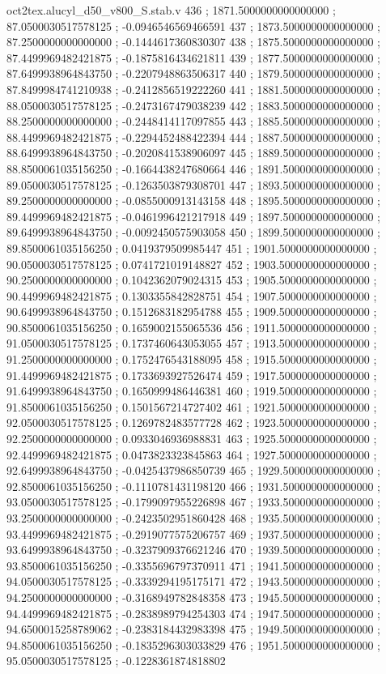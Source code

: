 \begin{filecontents}[overwrite]{oct2tex.alucyl_d50_v800_S.stab.v}
436 ; 1871.5000000000000000 ; 87.0500030517578125 ; -0.0946546569466591
437 ; 1873.5000000000000000 ; 87.2500000000000000 ; -0.1444617360830307
438 ; 1875.5000000000000000 ; 87.4499969482421875 ; -0.1875816434621811
439 ; 1877.5000000000000000 ; 87.6499938964843750 ; -0.2207948863506317
440 ; 1879.5000000000000000 ; 87.8499984741210938 ; -0.2412856519222260
441 ; 1881.5000000000000000 ; 88.0500030517578125 ; -0.2473167479038239
442 ; 1883.5000000000000000 ; 88.2500000000000000 ; -0.2448414117097855
443 ; 1885.5000000000000000 ; 88.4499969482421875 ; -0.2294452488422394
444 ; 1887.5000000000000000 ; 88.6499938964843750 ; -0.2020841538906097
445 ; 1889.5000000000000000 ; 88.8500061035156250 ; -0.1664438247680664
446 ; 1891.5000000000000000 ; 89.0500030517578125 ; -0.1263503879308701
447 ; 1893.5000000000000000 ; 89.2500000000000000 ; -0.0855000913143158
448 ; 1895.5000000000000000 ; 89.4499969482421875 ; -0.0461996421217918
449 ; 1897.5000000000000000 ; 89.6499938964843750 ; -0.0092450575903058
450 ; 1899.5000000000000000 ; 89.8500061035156250 ; 0.0419379509985447
451 ; 1901.5000000000000000 ; 90.0500030517578125 ; 0.0741721019148827
452 ; 1903.5000000000000000 ; 90.2500000000000000 ; 0.1042362079024315
453 ; 1905.5000000000000000 ; 90.4499969482421875 ; 0.1303355842828751
454 ; 1907.5000000000000000 ; 90.6499938964843750 ; 0.1512683182954788
455 ; 1909.5000000000000000 ; 90.8500061035156250 ; 0.1659002155065536
456 ; 1911.5000000000000000 ; 91.0500030517578125 ; 0.1737460643053055
457 ; 1913.5000000000000000 ; 91.2500000000000000 ; 0.1752476543188095
458 ; 1915.5000000000000000 ; 91.4499969482421875 ; 0.1733693927526474
459 ; 1917.5000000000000000 ; 91.6499938964843750 ; 0.1650999486446381
460 ; 1919.5000000000000000 ; 91.8500061035156250 ; 0.1501567214727402
461 ; 1921.5000000000000000 ; 92.0500030517578125 ; 0.1269782483577728
462 ; 1923.5000000000000000 ; 92.2500000000000000 ; 0.0933046936988831
463 ; 1925.5000000000000000 ; 92.4499969482421875 ; 0.0473823323845863
464 ; 1927.5000000000000000 ; 92.6499938964843750 ; -0.0425437986850739
465 ; 1929.5000000000000000 ; 92.8500061035156250 ; -0.1110781431198120
466 ; 1931.5000000000000000 ; 93.0500030517578125 ; -0.1799097955226898
467 ; 1933.5000000000000000 ; 93.2500000000000000 ; -0.2423502951860428
468 ; 1935.5000000000000000 ; 93.4499969482421875 ; -0.2919077575206757
469 ; 1937.5000000000000000 ; 93.6499938964843750 ; -0.3237909376621246
470 ; 1939.5000000000000000 ; 93.8500061035156250 ; -0.3355696797370911
471 ; 1941.5000000000000000 ; 94.0500030517578125 ; -0.3339294195175171
472 ; 1943.5000000000000000 ; 94.2500000000000000 ; -0.3168949782848358
473 ; 1945.5000000000000000 ; 94.4499969482421875 ; -0.2838989794254303
474 ; 1947.5000000000000000 ; 94.6500015258789062 ; -0.2383184432983398
475 ; 1949.5000000000000000 ; 94.8500061035156250 ; -0.1835296303033829
476 ; 1951.5000000000000000 ; 95.0500030517578125 ; -0.1228361874818802
\end{filecontents}
